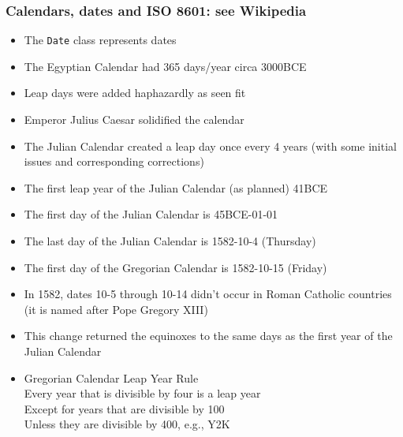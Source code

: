 \documentclass[11pt,pdftex,dvipsnames,usenames,helvetica]{beamer}
\begin{document}
\begin{frame} 
\frametitle{Calendars, dates and ISO 8601: see Wikipedia}
\begin{itemize}
\item The {\tt Date} class represents dates
\item The Egyptian Calendar had 365 days/year circa 3000BCE
\item Leap days were added haphazardly as seen fit
\item Emperor Julius Caesar solidified the calendar
\item The Julian Calendar created a leap day once every 
4 years (with some initial issues and corresponding corrections)
\item The first leap year of the Julian Calendar (as planned) 41BCE
\item The first day of the Julian Calendar is 45BCE-01-01 
\item The last day of the Julian Calendar is 1582-10-4 (Thursday)
\item The first day of the Gregorian Calendar is 1582-10-15 (Friday)
\item In 1582, dates 10-5 through 10-14 didn't occur
in Roman Catholic countries (it is named after Pope Gregory XIII)
\item This change returned the equinoxes to the same days as
the first year of the Julian Calendar
\item Gregorian Calendar Leap Year Rule\\
Every year that is divisible by four is a leap year\\
Except for years that are divisible by 100\\ 
Unless they are divisible by 400, e.g., Y2K
\end{itemize}

\end{frame}
\end{document}
